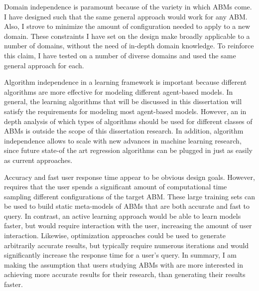Domain independence is paramount because of the variety in which ABMs come.
I have designed \fw such that the same general approach would work for any ABM.
Also, I strove to minimize the amount of configuration needed to apply \fw to a new domain.
These constraints I have set on the design make \fw broadly applicable to a number of domains, without the need of in-depth domain knowledge.
To reinforce this claim, I have tested \fw on a number of diverse domains and used the same general approach for each.

Algorithm independence in a learning framework is important because different algorithms are more effective for modeling different agent-based models.
In general, the learning algorithms that will be discussed in this dissertation will satisfy the requirements for modeling most agent-based models.
However, an in depth analysis of which types of algorithms should be used for different classes of ABMs is outside the scope of this dissertation research.
In addition, algorithm independence allows \fw to scale with new advances in machine learning research, since future state-of the art regression algorithms can be plugged in just as easily as current approaches.

Accuracy and fast user response time appear to be obvious design goals.
However, \fw requires that the user spends a significant amount of computational time sampling different configurations of the target ABM.
These large training sets can be used to build static meta-models of ABMs that are both accurate and fast to query.
In contrast, an active learning approach would be able to learn models faster, but would require interaction with the user, increasing the amount of user interaction.
Likewise, optimization approaches could be used to generate arbitrarily accurate results, but typically require numerous iterations and would significantly increase the response time for a user's query.
In summary, I am making the assumption that users studying ABMs with \fw are more interested in achieving more accurate results for their research, than generating their results faster.






